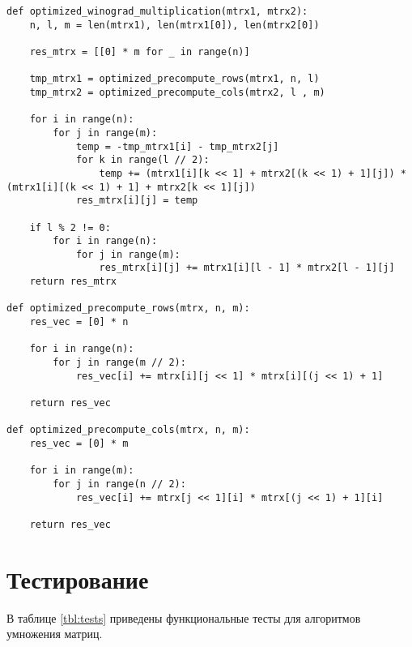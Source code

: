 \begin{center}
\captionsetup{justification=raggedright,singlelinecheck=off}
\begin{lstlisting}[label=lst:optimized_winograd,caption=Оптимизированный алгоритм Винограда]
def optimized_winograd_multiplication(mtrx1, mtrx2):
	n, l, m = len(mtrx1), len(mtrx1[0]), len(mtrx2[0])
	
	res_mtrx = [[0] * m for _ in range(n)]
	
	tmp_mtrx1 = optimized_precompute_rows(mtrx1, n, l)
	tmp_mtrx2 = optimized_precompute_cols(mtrx2, l , m)
	
	for i in range(n):
		for j in range(m):
			temp = -tmp_mtrx1[i] - tmp_mtrx2[j]
			for k in range(l // 2):
				temp += (mtrx1[i][k << 1] + mtrx2[(k << 1) + 1][j]) * (mtrx1[i][(k << 1) + 1] + mtrx2[k << 1][j])
			res_mtrx[i][j] = temp
	
	if l % 2 != 0:
		for i in range(n):
			for j in range(m):
				res_mtrx[i][j] += mtrx1[i][l - 1] * mtrx2[l - 1][j]
	return res_mtrx

def optimized_precompute_rows(mtrx, n, m):
	res_vec = [0] * n
	
	for i in range(n):
		for j in range(m // 2):
			res_vec[i] += mtrx[i][j << 1] * mtrx[i][(j << 1) + 1]
	
	return res_vec

def optimized_precompute_cols(mtrx, n, m):
	res_vec = [0] * m
	
	for i in range(m):
		for j in range(n // 2):
			res_vec[i] += mtrx[j << 1][i] * mtrx[(j << 1) + 1][i]
		
	return res_vec

\end{lstlisting}
\end{center}

\section{Тестирование}

В таблице \ref{tbl:tests} приведены функциональные тесты для алгоритмов умножения матриц.


